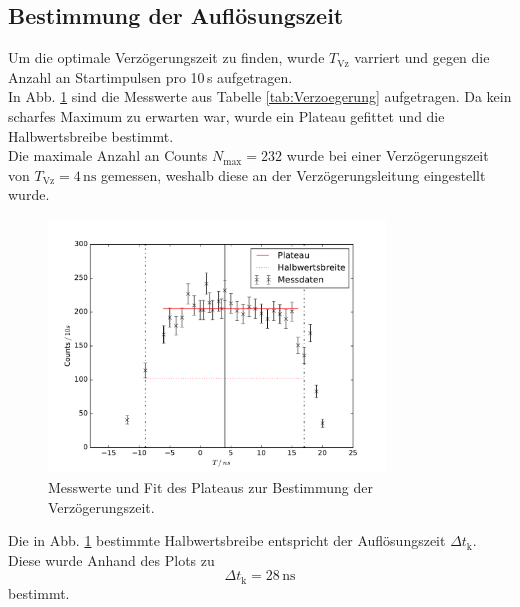 \subsection{Bestimmung der Auflösungszeit}
Um die optimale Verzögerungszeit zu finden, wurde  $T_\text{Vz}$ varriert und gegen die Anzahl an Startimpulsen pro 10\,s aufgetragen.\\
In Abb. \ref{fig:Verzoegerung} sind die Messwerte aus Tabelle \ref{tab:Verzoegerung} aufgetragen. Da kein scharfes Maximum zu erwarten war,
wurde ein Plateau gefittet und die Halbwertsbreibe bestimmt.\\
Die maximale Anzahl an Counts $N_{\text{max}}=232$ wurde bei einer Verzögerungszeit von $T_\text{Vz}=4\,\text{ns}$ gemessen, weshalb diese
an der Verzögerungsleitung eingestellt wurde.
\begin{figure}
  \centering
  \includegraphics[width=0.8\textwidth]{plots/plotVerzoegerung.pdf}
  \caption{Messwerte und Fit des Plateaus zur Bestimmung der Verzögerungszeit.}
  \label{fig:Verzoegerung}
\end{figure}
Die in Abb. \ref{fig:Verzoegerung} bestimmte Halbwertsbreibe entspricht der Auflösungszeit $\Delta t_{\text{k}}$. Diese wurde Anhand
des Plots zu
\begin{equation*}
  \Delta t_{\text{k}}=28\,\text{ns}
\end{equation*}
bestimmt.

